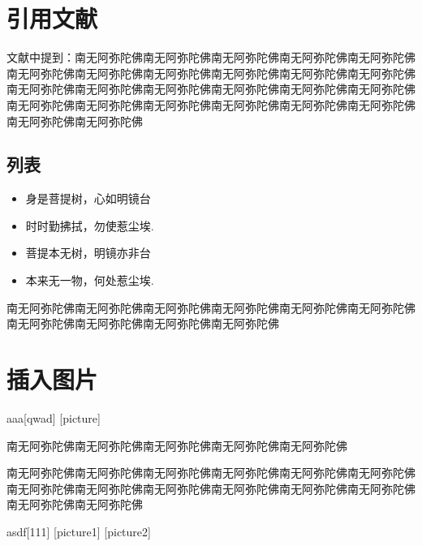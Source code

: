 \documentclass[UTF8,a4paper,10pt]{article}
\begin{document}
\setlength{\oddsidemargin}{-.5cm}  %
\setlength{\evensidemargin}{\oddsidemargin}
\setlength{\textwidth}{17.00cm}

\section{引用文献}
\indent 文献\supercite{ref1,ref2}中提到：南无阿弥陀佛南无阿弥陀佛南无阿弥陀佛南无阿弥陀佛南无阿弥陀佛南无阿弥陀佛南无阿弥陀佛南无阿弥陀佛南无阿弥陀佛南无阿弥陀佛南无阿弥陀佛南无阿弥陀佛南无阿弥陀佛南无阿弥陀佛南无阿弥陀佛南无阿弥陀佛南无阿弥陀佛南无阿弥陀佛南无阿弥陀佛南无阿弥陀佛南无阿弥陀佛南无阿弥陀佛南无阿弥陀佛南无阿弥陀佛南无阿弥陀佛
\subsection{列表}
\begin{itemize}
    \item 身是菩提树，心如明镜台
    \item 时时勤拂拭，勿使惹尘埃.
    \item 菩提本无树，明镜亦非台
    \item 本来无一物，何处惹尘埃.
\end{itemize}
南无阿弥陀佛南无阿弥陀佛南无阿弥陀佛南无阿弥陀佛南无阿弥陀佛南无阿弥陀佛南无阿弥陀佛南无阿弥陀佛南无阿弥陀佛南无阿弥陀佛
\section{插入图片}
\begin{Figure}[H]{aaa}[qwad]
[picture]
\end{Figure}
\noindent 南无阿弥陀佛南无阿弥陀佛南无阿弥陀佛南无阿弥陀佛南无阿弥陀佛\par
南无阿弥陀佛南无阿弥陀佛南无阿弥陀佛南无阿弥陀佛南无阿弥陀佛南无阿弥陀佛南无阿弥陀佛南无阿弥陀佛南无阿弥陀佛南无阿弥陀佛南无阿弥陀佛南无阿弥陀佛南无阿弥陀佛南无阿弥陀佛
\par
\begin{Figure}[H]{asdf}[111]
[picture1]
[picture2]
\par
\end{Figure}
\end{document}
